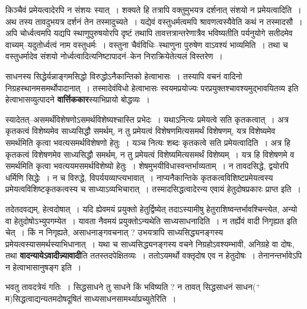 \documentclass[article,12pt,a4paper]{memoir}
\newcommand{\add}[1]{($^{+}$#1)}
\begin{document}
	  \pstart किञ्चैवं प्रमेयत्वादेरपि न संशयः स्यात् । शक्यते हि तत्रापि वक्तुमुभयत्र दर्शनात् संशयो न प्रमेयत्वादिति । अथ तस्य तावदुभयत्र दर्शनं तेन तस्मादुच्यते । यद्येवं वस्तुधर्मत्वमपि श्रावणत्वस्यैवेति कथं न तस्मादसौ । अपि चोर्ध्वत्वमपि यद्यपि स्थाणुपुरुषयोरपि दृष्टं तथापि तावत्तत्रान्तरेणात्रैव भविष्यतीति पर्यनुयोगे सतीदमेव वाच्यम्--यदुतोर्ध्वत्वं नाम वस्तुधर्मः । वस्तुना चैवंविधिः--स्थाणुना पुरुषेण वाऽवश्यं भाव्यमिति । तथा च वस्तुधर्मादेव संशयो नोर्ध्वत्वादित्यनिष्टापादनं--केन निराक्रियेतेत्यलं विस्तरेण ।
	\pend
      

	  \pstart साधनस्य सिद्धेर्यन्नाङ्गमसिद्धो विरुद्धोऽनैकान्तिको हेत्वाभासः । तस्यापि वचनं वादिनो निग्रहस्थानमसमर्थोपादानात् । तस्मादेवंविधो हेत्वाभासः स्वयमप्रयोज्यः परप्रयुक्तश्चावश्यमुद्भावयितव्य इति हेत्वाभासव्युत्पादने \textbf{वार्त्तिककार}स्याभिप्रायो बोद्धव्यः ।
	\pend
      

	  \pstart स्यादेतत्--असमर्थंविशेषणोऽसमर्थविशेष्यश्चास्ति प्रभेदः । यथाऽनित्यः प्रमेयत्वे सति कृतकत्वात् । अत्र कृतकत्वं विशेष्यमेव साध्यसिद्धौ समर्थम्, न तु प्रमेयत्वं विशेषणमित्यसमर्थं विशेषणम्, यत्र विशेष्यमेव समर्थमिति कृत्वा भवत्यसमर्थविशेषणो हेतुः । यञ्च  नित्यः शब्दः कृतकत्वे सति प्रमेयत्वादिति । अत्र हि कृतकत्वं विशेषणमेव साध्यसिद्धौ समर्थम्, न तु प्रमेयत्वं विशेष्यमित्यसमर्थं विशेष्यम् । यत्र हि विशेषणमे \leavevmode{} व समर्थमिति कृत्वा भवत्ययमसमर्थविशेष्यो हेतुः । शेषमुभयीविधास्वन्तर्भाव्यताम् । न तावदसिद्धे, द्वयोरपि धर्मिणि सिद्धेः । न च विरुद्धे, विपर्ययव्याप्त्यभावात् । नाप्यनैकान्तिके कृतकत्वविशिष्टप्रमेयत्वस्य प्रमेयत्वविशिष्टकृतकत्वस्य च साध्याऽव्यभिचारात् । तस्मादसिद्धत्वादेरन्य एवायं हेतुदोषप्रकारः प्राप्त इति ।
	\pend
      

	  \pstart तदेतदवद्यम्, हेत्वदोषात् । यदि ह्येवमयं प्रयुक्तो हेतुर्द्विष्येत्  तदाऽस्यामीषु हेतुराशिष्वन्तर्भावश्चिन्त्येत, अन्यो वा हेतुदोषोऽभ्युपगम्येत । यावता नैवमयं प्रयुक्तोऽन्यथेति साध्यसाधनादिति । न तर्ह्येवं वादी निगृह्यत इति चेत् । किं न निगृह्यते, असाधनाङ्गवचनात् ? उभयत्रापि साध्यसिद्ध्यनङ्गस्य प्रमेयत्वस्यासमर्थस्याभिधानात् । यथा च साध्यसिद्ध्यनङ्गस्य वचने निग्रहोऽवश्यम्भावी, अनिग्रहे वा दोषः, तथा \textbf{वादन्यायेऽवादीन्न्यावादी}ति ततस्तदपेक्षितव्यः । ततोऽयमर्थो वक्तृदोष एव न हेतुदोषः । तेनानन्तर्भावेऽपि न हेत्वाभासानुषङ्ग इति ।
	\pend
      

	  \pstart भवतु तावदत्रेयं गतिः । सिद्धसाधने तु साधने किं भविष्यति ? न तावत् सिद्धसाधनं साधन\add{म}सिद्धत्वाद्यन्यतमदोषदूषितं साध्यसाधनसामर्थ्याप्रच्युतेरिति ।
	\pend
      
\end{document}
